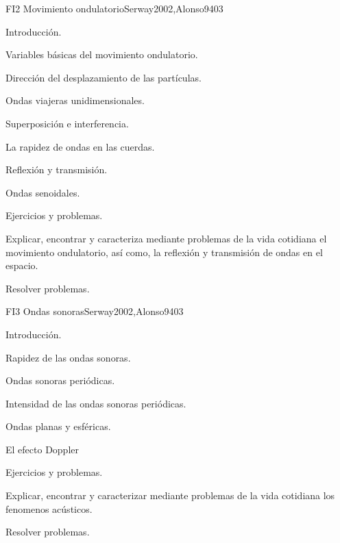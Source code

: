 \begin{syllabus}
\begin{unit}{FI2 Movimiento ondulatorio}{}{Serway2002,Alonso94}{0}{3}
\begin{topics}
      \item Introducción.
        \item Variables básicas del movimiento ondulatorio.
        \item Dirección del desplazamiento de las partículas.
        \item Ondas viajeras unidimensionales.
        \item Superposición e interferencia.
        \item La rapidez de ondas en las cuerdas.
        \item Reflexión y transmisión.
        \item Ondas senoidales.
        \item Ejercicios y problemas.
   \end{topics}
   \begin{learningoutcomes}
      \item Explicar, encontrar y caracteriza mediante problemas de la vida cotidiana el movimiento ondulatorio, así como, la reflexión y transmisión de ondas en el espacio.
      \item Resolver problemas.
   \end{learningoutcomes}
\end{unit}

\begin{unit}{FI3 Ondas sonoras}{}{Serway2002,Alonso94}{0}{3}
\begin{topics}
      \item  Introducción.
        \item Rapidez de las ondas sonoras.
        \item Ondas sonoras periódicas.
        \item Intensidad de las ondas sonoras periódicas.
        \item Ondas planas y esféricas.
        \item El efecto Doppler
        \item Ejercicios y problemas.
   \end{topics}
   \begin{learningoutcomes}
      \item Explicar, encontrar y caracterizar mediante problemas de la vida cotidiana los fenomenos acústicos.
      \item Resolver problemas.
   \end{learningoutcomes}
\end{unit}


\end{syllabus}
